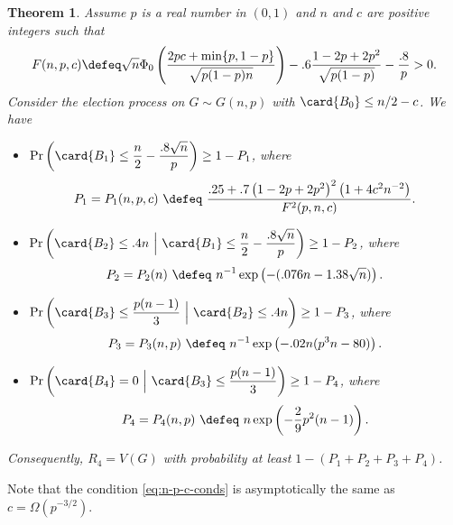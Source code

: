 \documentclass[11pt]{article}
\numberwithin{equation}{section}
\newtheorem{theorem}{Theorem}[section]
\theoremstyle{definition}
\theoremstyle{plain}
\begin{document}
			\begin{theorem} \label{thm:const-advantage}
				Assume $p$ is a real number in $(0, 1)$ and $n$ and $c$ are positive integers such that 
				\begin{equation} \label{eq:n-p-c-conds}
					F(n, p, c) \defeq \sqrt{n} \Phi_0 \left( \frac{2pc %
						+ \min\{p, 1 - p\}  %
					}{\sqrt{p(1 - p)n}} \right) - .6\frac{1 - 2p + 2p^2}{\sqrt{p(1 - p)}} - \frac{.8}{p} > 0.
				\end{equation}
				Consider the election process on $G\sim G(n, p)$ with $\card{B_0}\le n/2 - c$.
				We have
				\begin{itemize}
					\item $\displaystyle \Pr\left(\card{B_1}\le \frac{n}{2} - \frac{.8\sqrt{n}}{p}\right) \ge 1 - P_1$, where
					\[
					P_1 = P_1(n, p, c) \ \defeq \ \frac{.25 + .7\left(1 - 2p + 2p^2\right)^2\left(1 + 4c^2n^{-2}\right)}{F^2(p, n, c)}.
					\]
					\item $\displaystyle \Pr\left(\card{B_2} \le .4n ~\Big|~ \card{B_1}\le \frac{n}{2} - \frac{.8\sqrt{n}}{p}\right) \ge 1 - P_2$, where
					\[
					P_2 = P_2(n) \ \defeq \ n^{-1}\exp\left( -(.076n - 1.38\sqrt{n}) \right).
					\]
					\item $\displaystyle \Pr\left(\card{B_3}\le \frac{p(n - 1)}{3} ~\Big|~ \card{B_2} \le .4n\right) \ge 1 - P_3$, where
					\[
					P_3 = P_3(n, p) \ \defeq \ n^{-1}\exp\left( -.02n(p^3n - 80) \right).
					\]
					\item $\displaystyle \Pr\left(\card{B_4} = 0 ~\Big|~ \card{B_3}\le \frac{p(n - 1)}{3}\right) \ge 1 - P_4$, where
					\[
					P_4 = P_4(n, p) \ \defeq \ n\exp\left(-\frac{2}{9}p^2(n-1)\right).
					\]
				\end{itemize}
				Consequently, $R_4 = V(G)$ with probability at least $1 - (P_1 + P_2 + P_3 + P_4)$.
			\end{theorem}

			
			Note that the condition \eqref{eq:n-p-c-conds} is asymptotically the same as $c = \Omega(p^{-3/2})$.
			
\end{document}
